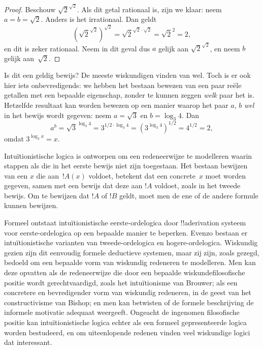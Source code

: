 \documentclass[openany]{memoir}
\begin{document}
\begin{proof}
Beschouw $\sqrt{2}^{\sqrt{2}}$. Als dit getal rationaal is, zijn we klaar: neem
$a = b = \sqrt{2}$. Anders is het irrationaal. Dan geldt
\[
(\sqrt{2}^{\sqrt{2}})^{\sqrt{2}} = \sqrt{2}^{\sqrt{2} \cdot
  \sqrt{2}} = \sqrt{2}^2 = 2,
\]
en dit is zeker rationaal. Neem in dit geval dus $a$ gelijk aan
$\sqrt{2}^{\sqrt{2}}$, en neem $b$ gelijk aan~$\sqrt 2$.
\end{proof}

Is dit een geldig bewijs? De meeste wiskundigen vinden van wel. Toch is er ook
hier iets onbevredigends: we hebben het bestaan bewezen van een paar reële
getallen met een bepaalde eigenschap, zonder te kunnen zeggen \emph{welk} paar
het is. Hetzelfde resultaat kan worden bewezen op een manier waarop het paar
$a$, $b$ \emph{wel} in het bewijs wordt gegeven: neem $a = \sqrt{3}$ en
$b = \log_3 4$. Dan
\[
a^b = \sqrt{3}^{\log_3 4} = 3^{1/2 \cdot \log_3 4} = (3^{\log_3
  4})^{1/2} = 4^{1/2}= 2,
\]
omdat $3^{\log_3 x} = x$.

Intuïtionistische logica is ontworpen om een redeneerwijze te modelleren waarin
stappen als die in het eerste bewijs niet zijn toegestaan. Het bestaan bewijzen
van een $x$ die aan~$!A(x)$ voldoet, betekent dat een concrete~$x$ moet worden
gegeven, samen met een bewijs dat deze aan $!A$ voldoet, zoals in het tweede
bewijs. Om te bewijzen dat $!A$ of $!B$ geldt, moet men de ene of de andere
formule kunnen bewijzen.

Formeel ontstaat intuïtionistische eerste-ordelogica door !!a{derivation} systeem
voor eerste-ordelogica op een bepaalde manier te beperken. Evenzo bestaan er
intuïtionistische varianten van tweede-ordelogica en hogere-ordelogica. Wiskundig
gezien zijn dit eenvoudig formele deductieve systemen, maar zij zijn, zoals
gezegd, bedoeld om een bepaalde vorm van wiskundig redeneren te modelleren. Men
kan deze opvatten als de redeneerwijze die door een bepaalde
wiskundefilosofische positie wordt gerechtvaardigd, zoals het intuïtionisme van
Brouwer; als een concretere en bevredigender vorm van wiskundig redeneren, in de
geest van het constructivisme van Bishop; en men kan betwisten of de formele
beschrijving de informele motivatie adequaat weergeeft. Ongeacht de ingenomen
filosofische positie kan intuïtionistische logica echter als een formeel
gepresenteerde logica worden bestudeerd, en om uiteenlopende redenen vinden veel
wiskundige logici dat interessant.
\end{document}
